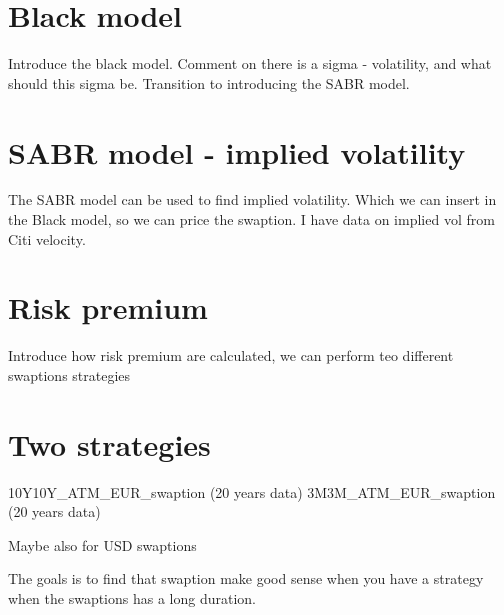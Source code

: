 \documentclass{article}
\begin{document}
\section{Black model}
Introduce the black model.
Comment on there is a sigma - volatility, and what should this sigma be. Transition to introducing the SABR model.

\section{SABR model - implied volatility}
The SABR model can be used to find implied volatility. Which we can insert in the Black model, so we can price the swaption. 
I have data on implied vol from Citi velocity.

\section{Risk premium}
Introduce how risk premium are calculated, we can perform teo different swaptions strategies 

\section{Two strategies}
10Y10Y_ATM_EUR_swaption (20 years data)
3M3M_ATM_EUR_swaption (20 years data)

Maybe also for USD swaptions

The goals is to find that swaption make good sense when you have a strategy when the swaptions has a long duration. 
\end{document}
